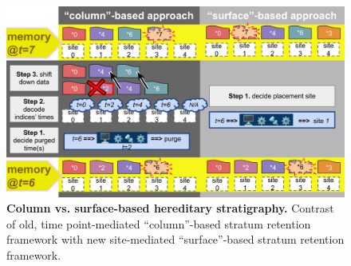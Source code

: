 \begin{figure}
  \centering
  \includegraphics[width=\linewidth]{img/surf-vs-column-schematic}
  \caption{
  \textbf{Column vs. surface-based hereditary stratigraphy.}
  Contrast of old, time point-mediated ``column''-based stratum retention framework with new site-mediated ``surface''-based stratum retention framework.}
  \label{fig:surf-vs-column-schematic}
\end{figure}
